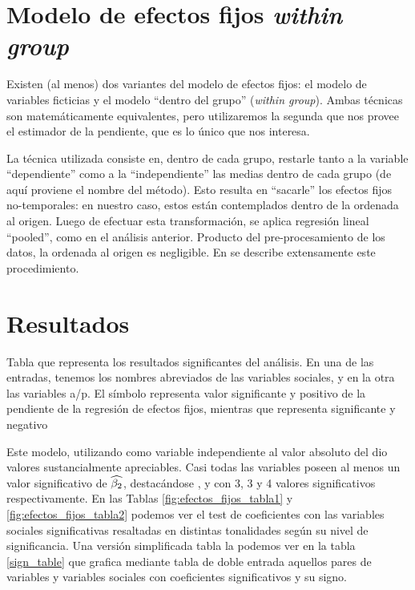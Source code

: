 \section{Modelo de efectos fijos \emph{within group}}

Existen (al menos) dos variantes del modelo de efectos fijos: el modelo de variables ficticias y el modelo ``dentro del grupo'' (\emph{within group}). Ambas técnicas son matemáticamente equivalentes, pero utilizaremos la segunda que nos provee el estimador de la pendiente, que es lo único que nos interesa.

La técnica utilizada consiste en, dentro de cada grupo, restarle tanto a la variable ``dependiente'' como a la ``independiente'' las medias dentro de cada grupo (de aquí proviene el nombre del método). Esto resulta en ``sacarle'' los efectos fijos no-temporales: en nuestro caso, estos están contemplados dentro de la ordenada al origen. Luego de efectuar esta transformación, se aplica regresión lineal ``pooled'', como en el análisis anterior. Producto del pre-procesamiento de los datos, la ordenada al origen es negligible. En \cite[chap 16]{gujarati1999} se describe extensamente este procedimiento.


\section{Resultados}


\begin{table}[t!]

\caption{Tabla que representa los resultados significantes del análisis. En una de las entradas, tenemos los nombres abreviados de las variables sociales, y en la otra las variables a/p. El símbolo \psl representa valor significante y positivo de la pendiente de la regresión de efectos fijos, mientras que \nsl representa significante y negativo }
\label{sign_table}
\end{table}

Este modelo, utilizando como variable independiente al valor absoluto del \entrainment dio valores sustancialmente apreciables. Casi todas las variables \ap poseen al menos un valor significativo de $\widehat{\beta_2}$, destacándose \ENGMEAN, \NOISETOHARMONICS y \FOMEAN  con 3, 3 y 4 valores significativos respectivamente. En las Tablas \ref{fig:efectos_fijos_tabla1} y \ref{fig:efectos_fijos_tabla2} podemos ver el test de coeficientes con las variables sociales significativas resaltadas en distintas tonalidades según su nivel de significancia. Una versión simplificada tabla la podemos ver en la tabla \ref{sign_table} que grafica mediante tabla de doble entrada aquellos pares de variables \ap y variables sociales con coeficientes significativos y su signo.

